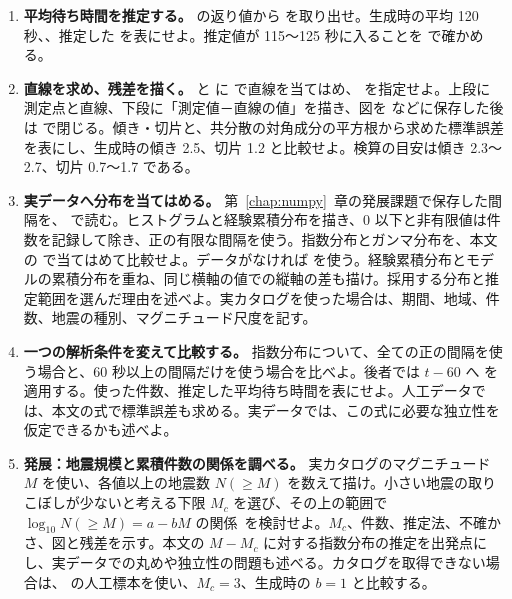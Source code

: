 \begin{enumerate}
\item \textbf{平均待ち時間を推定する。}
 の返り値から  を取り出せ。生成時の平均 120 秒、、推定した  を表にせよ。推定値が 115～125 秒に入ることを  で確かめる。

\item \textbf{直線を求め、残差を描く。}
 と  に  で直線を当てはめ、 を指定せよ。上段に測定点と直線、下段に「測定値－直線の値」を描き、図を  などに保存した後は  で閉じる。傾き・切片と、共分散の対角成分の平方根から求めた標準誤差を表にし、生成時の傾き 2.5、切片 1.2 と比較せよ。検算の目安は傾き 2.3～2.7、切片 0.7～1.7 である。

\item \textbf{実データへ分布を当てはめる。}
第~\ref{chap:numpy}~章の発展課題で保存した間隔を、 で読む。ヒストグラムと経験累積分布を描き、0 以下と非有限値は件数を記録して除き、正の有限な間隔を使う。指数分布とガンマ分布を、本文の  で当てはめて比較せよ。データがなければ  を使う。経験累積分布とモデルの累積分布を重ね、同じ横軸の値での縦軸の差も描け。採用する分布と推定範囲を選んだ理由を述べよ。実カタログを使った場合は、期間、地域、件数、地震の種別、マグニチュード尺度を記す。

\item \textbf{一つの解析条件を変えて比較する。}
指数分布について、全ての正の間隔を使う場合と、60 秒以上の間隔だけを使う場合を比べよ。後者では \(t-60\) へ  を適用する。使った件数、推定した平均待ち時間を表にせよ。人工データでは、本文の式で標準誤差も求める。実データでは、この式に必要な独立性を仮定できるかも述べよ。

\item \textbf{発展：地震規模と累積件数の関係を調べる。}
実カタログのマグニチュード \(M\) を使い、各値以上の地震数 \(N(\geq M)\) を数えて描け。小さい地震の取りこぼしが少ないと考える下限 \(M_c\) を選び、その上の範囲で \(\log_{10}N(\geq M)=a-bM\) の関係~\cite{gutenberg_richter_1944}を検討せよ。\(M_c\)、件数、推定法、不確かさ、図と残差を示す。本文の \(M-M_c\) に対する指数分布の推定を出発点にし、実データでの丸めや独立性の問題も述べる。カタログを取得できない場合は、 の人工標本を使い、\(M_c=3\)、生成時の \(b=1\) と比較する。

\end{enumerate}
